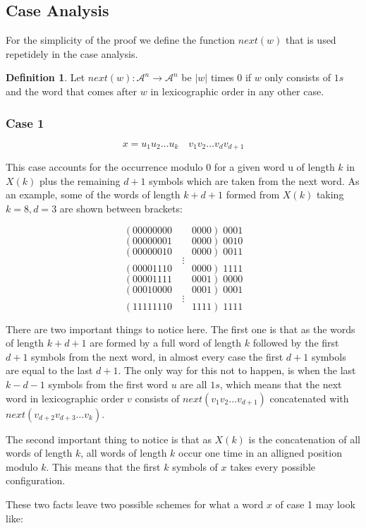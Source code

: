 \documentclass[11pt,a4paper]{tesis}
\theoremstyle{definition}
\newtheorem{definition}{Definition}[section]
\begin{document}
\subsection{Case Analysis}
For the simplicity of the proof we define the function $next(w)$ that is used repetidely in the case analysis.

\begin{definition}
    Let $next(w):\mathcal{A}^n \rightarrow \mathcal{A}^n $ be $|w|$ times 0 if $w$ only consists of $1s$ and the word that comes after $w$ in lexicographic order in any other case.
\end{definition}

\subsubsection{Case 1}
$$x = u_1 u_2 \dots u_k \quad v_1 v_2 \dots v_{d} v_{d + 1}$$

This case accounts for the occurrence modulo 0 for a given word u of length $k$ in $X(k)$ plus the remaining $d + 1$ symbols which are taken from the next word.
As an example, some of the words of length $k + d + 1$ formed from $X(k)$ taking $k = 8, d = 3$ are shown between brackets:

$$( 00000000 \qquad 0000 ) \; 0001$$
$$( 00000001 \qquad 0000 ) \; 0010$$
$$( 00000010 \qquad 0000 ) \; 0011$$
$$\vdots$$
$$( 00001110 \qquad 0000 ) \; 1111$$
$$( 00001111 \qquad 0001 ) \; 0000$$
$$( 00010000 \qquad 0001 ) \; 0001$$
$$\vdots$$
$$( 11111110 \qquad 1111 ) \; 1111$$

There are two important things to notice here. The first one is that as the words of length $k + d + 1$ are formed by a full word of length $k$ followed by the first $d + 1$ symbols from the next word, in almost every case the first $d + 1$ symbols are equal to the last $d + 1$.
The only way for this not to happen, is when the last $k - d - 1$ symbols from the first word $u$ are all $1s$, which means that the next word in lexicographic order $v$ consists of $next(v_1 v_2 \dots v_{d + 1})$ concatenated with $next(v_{d + 2} v_{d + 3} \dots v_{k})$.

The second important thing to notice is that as $X(k)$ is the concatenation of all words of length $k$, all words of length $k$ occur one time in an alligned position modulo $k$. This means that the first $k$ symbols of $x$ takes every possible configuration. 

These two facts leave two possible schemes for what a word $x$ of case 1 may look like:
\end{document}
